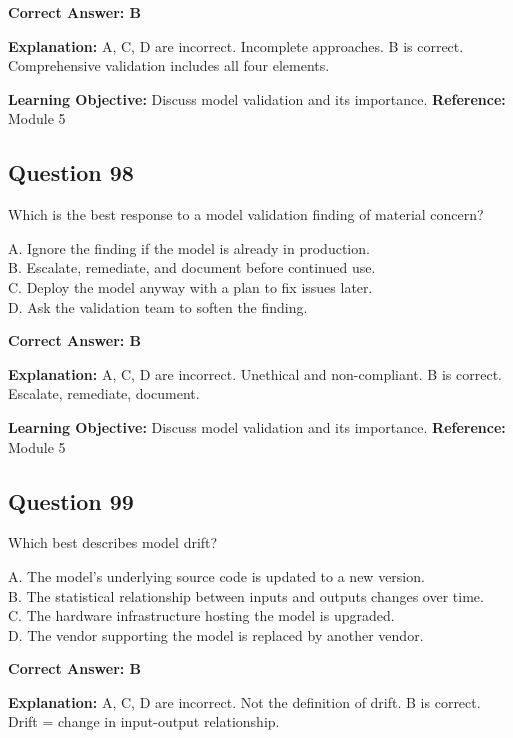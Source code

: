\documentclass[11pt]{article}
\begin{document}
	\vspace{0.4em}
	\textbf{Correct Answer: B}
	
	\textbf{Explanation:}
	A, C, D are incorrect. Incomplete approaches.
	B is correct. Comprehensive validation includes all four elements.
	
	\textbf{Learning Objective:} Discuss model validation and its importance.
	\textbf{Reference:} Module 5
	
	\subsection*{Question 98}
	Which is the best response to a model validation finding of material
	concern?
	
	A. Ignore the finding if the model is already in production.\\
	B. Escalate, remediate, and document before continued use.\\
	C. Deploy the model anyway with a plan to fix issues later.\\
	D. Ask the validation team to soften the finding.
	
	\vspace{0.4em}
	\textbf{Correct Answer: B}
	
	\textbf{Explanation:}
	A, C, D are incorrect. Unethical and non-compliant.
	B is correct. Escalate, remediate, document.
	
	\textbf{Learning Objective:} Discuss model validation and its importance.
	\textbf{Reference:} Module 5
	
	\subsection*{Question 99}
	Which best describes model drift?
	
	A. The model's underlying source code is updated to a new version.\\
	B. The statistical relationship between inputs and outputs changes over
	time.\\
	C. The hardware infrastructure hosting the model is upgraded.\\
	D. The vendor supporting the model is replaced by another vendor.
	
	\vspace{0.4em}
	\textbf{Correct Answer: B}
	
	\textbf{Explanation:}
	A, C, D are incorrect. Not the definition of drift.
	B is correct. Drift = change in input-output relationship.
	
\end{document}
